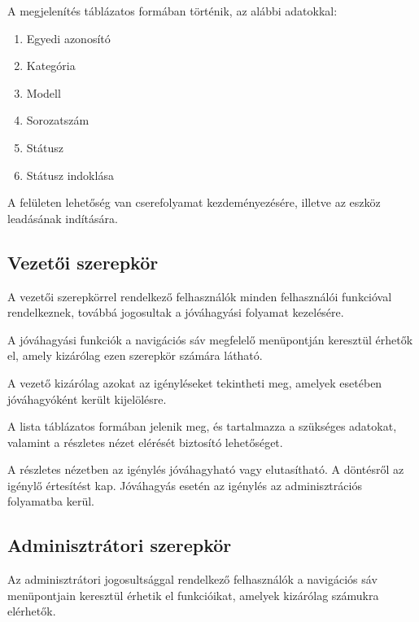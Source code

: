 \documentclass[
]{thesis-ekf}
\theoremstyle{definition}
\theoremstyle{remark}
\begin{document}
\begin{itemize}
	A megjelenítés táblázatos formában történik, az alábbi adatokkal:
	
	\begin{enumerate}
		\item Egyedi azonosító
		\item Kategória
		\item Modell
		\item Sorozatszám
		\item Státusz
		\item Státusz indoklása
	\end{enumerate}
	
	A felületen lehetőség van cserefolyamat kezdeményezésére, illetve az eszköz leadásának indítására.
	
\end{itemize}

\subsection{Vezetői szerepkör}

A vezetői szerepkörrel rendelkező felhasználók minden felhasználói funkcióval rendelkeznek, továbbá jogosultak a jóváhagyási folyamat kezelésére.

A jóváhagyási funkciók a navigációs sáv megfelelő menüpontján keresztül érhetők el, amely kizárólag ezen szerepkör számára látható.

A vezető kizárólag azokat az igényléseket tekintheti meg, amelyek esetében jóváhagyóként került kijelölésre.

A lista táblázatos formában jelenik meg, és tartalmazza a szükséges adatokat, valamint a részletes nézet elérését biztosító lehetőséget.

A részletes nézetben az igénylés jóváhagyható vagy elutasítható.
A döntésről az igénylő értesítést kap.
Jóváhagyás esetén az igénylés az adminisztrációs folyamatba kerül.

\subsection{Adminisztrátori szerepkör}

Az adminisztrátori jogosultsággal rendelkező felhasználók a navigációs sáv menüpontjain keresztül érhetik el funkcióikat, amelyek kizárólag számukra elérhetők.
\end{document}

